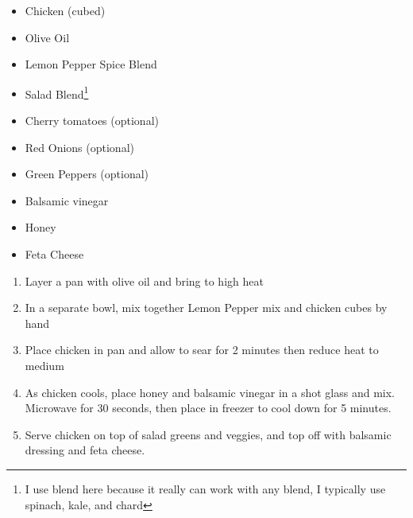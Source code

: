 \documentclass[oneside]{recipe}
\newcommand{\recipecolumn}[2]{
	\begin{multicols}{2}
	\raggedcolumns
	#1
	\columnbreak
	#2
	\end{multicols}
}
\begin{document}
\recipecolumn{
	\begin{itemize}
		\item Chicken (cubed)
		\item Olive Oil
		\item Lemon Pepper Spice Blend
		\item Salad Blend\footnote{I use blend here because it really can work with any blend, I typically use spinach, kale, and chard}
		\item Cherry tomatoes (optional)
		\item Red Onions (optional)
		\item Green Peppers (optional)
		\item Balsamic vinegar
		\item Honey
		\item Feta Cheese
	\end{itemize}
}{
	\begin{enumerate}	
		\item Layer a pan with olive oil and bring to high heat
		\item In a separate bowl, mix together Lemon Pepper mix and chicken cubes by hand
		\item Place chicken in pan and allow to sear for 2 minutes then reduce heat to medium
		\item As chicken cools, place honey and balsamic vinegar in a shot glass and mix. Microwave for 30 seconds, then place in freezer to cool down for 5 minutes. 
		\item Serve chicken on top of salad greens and veggies, and top off with balsamic dressing and feta cheese. 
	\end{enumerate}
}
\end{document}
